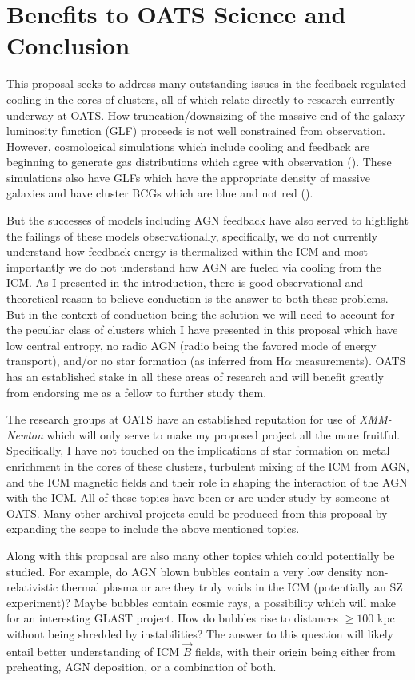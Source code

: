 \documentclass[11pt]{article}
\begin{document}
\section{Benefits to OATS Science and Conclusion}
This proposal seeks to address many outstanding issues in the feedback
regulated cooling in the cores of clusters, all of which relate
directly to research currently underway at OATS. How truncation/downsizing
of the massive end of the galaxy luminosity function (GLF) proceeds is not well
constrained from observation. However, cosmological simulations which
include cooling and feedback are beginning to generate gas
distributions which agree with observation
(\cite{2007ApJ...668....1N}). These simulations also have GLFs which
have the appropriate density of massive galaxies and have cluster BCGs
which are blue and not red (\cite{2006MNRAS.365...11C}).

But the successes of models including AGN feedback have also served to
highlight the failings of these models observationally, specifically,
we do not currently understand how feedback energy is thermalized
within the ICM and most importantly we do not understand how AGN are
fueled via cooling from the ICM. As I presented in the introduction,
there is good observational and theoretical reason to believe
conduction is the answer to both these problems. But in the context of
conduction being the solution we will need to account for the peculiar
class of clusters which I have presented in this proposal which 
have low central entropy, no radio AGN (radio being the favored
mode of energy transport), and/or no star formation (as inferred from
H${\alpha}$ measurements). OATS has an established stake in all these
areas of research and will benefit greatly from endorsing me as a
fellow to further study them.

The research groups at OATS have an established reputation for use of
{\it XMM-Newton} which will only serve to make my proposed project all
the more fruitful. Specifically, I have not touched on the
implications of star formation on metal enrichment in the cores of
these clusters, turbulent mixing of the ICM from AGN, and the
ICM magnetic fields and their role in shaping the interaction of the
AGN with the ICM. All of these topics have been or are under study by
someone at OATS. Many other archival projects could be produced from
this proposal by expanding the scope to include the above mentioned
topics.

Along with this proposal are also many other topics which could
potentially be studied. For example, do AGN blown bubbles contain a very low
density non-relativistic thermal plasma or are they truly voids in the
ICM (potentially an SZ experiment)? Maybe bubbles contain cosmic rays,
a possibility which will make for an interesting GLAST project. How do
bubbles rise to distances $\geq 100$ kpc without being shredded by
instabilities? The answer to this question will likely entail better
understanding of ICM $\vec{B}$ fields, with their origin being either
from preheating, AGN deposition, or a combination of both.
\end{document}
